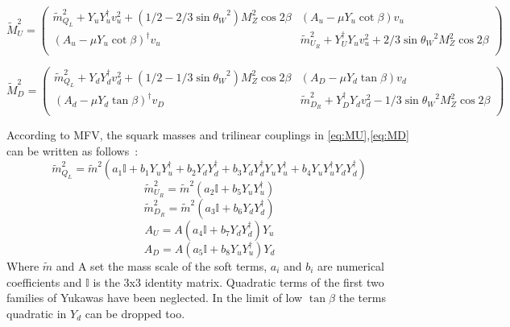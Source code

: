\begin{equation}
\tilde{M}_U^2 = 
\left( \begin{matrix}
\tilde{m}_{Q_L}^2 + Y_uY_u^{\dagger}v_u^2 + (1/2 - 2/3\sin{\theta_W}^2)M_Z^2\cos{2\beta} & (A_u - \mu Y_u\cot{\beta})v_u \\
(A_u - \mu Y_u\cot{\beta})^{\dagger}v_u & \tilde{m}_{U_R}^2 + Y_U^{\dagger}Y_uv_u^2 + 2/3\sin{\theta_W}^2M_Z^2\cos{2\beta} \\
\end{matrix}\right)
\label{eq:MU}
\end{equation}

\begin{equation}
\tilde{M}_D^2 = 
\left( \begin{matrix}
\tilde{m}_{Q_L}^2 + Y_dY_d^{\dagger}v_d^2 + (1/2 - 1/3\sin{\theta_W}^2)M_Z^2\cos{2\beta} & (A_D - \mu Y_d\tan{\beta})v_d \\
(A_d - \mu Y_d\tan{\beta})^{\dagger}v_D & \tilde{m}_{D_R}^2 + Y_D^{\dagger}Y_dv_d^2 - 1/3\sin{\theta_W}^2M_Z^2\cos{2\beta} \\
\end{matrix}\right)
\label{eq:MD}
\end{equation}

According to MFV, the squark masses and trilinear couplings in \ref{eq:MU},\ref{eq:MD} can be written as follows~\cite{DAmbrosio:2002vsn}:
\begin{equation}
\tilde{m}_{Q_L}^2 = \tilde{m}^2(a_1\mathbb{I} + b_1Y_uY_u^{\dagger} + b_2Y_dY_d^{\dagger} + b_3Y_dY_d^{\dagger}Y_uY_u^{\dagger} + b_4Y_uY_u^{\dagger}Y_dY_d^{\dagger})
\label{eq:soft1}
\end{equation}
\begin{equation}
\tilde{m}_{U_R}^2 = \tilde{m}^2(a_2\mathbb{I} + b_5Y_uY_u^{\dagger})
\label{eq:soft2}
\end{equation}
\begin{equation}
\tilde{m}_{D_R}^2 = \tilde{m}^2(a_3\mathbb{I} + b_6Y_dY_d^{\dagger})
\label{eq:soft3}
\end{equation}
\begin{equation}
A_U = A(a_4\mathbb{I} + b_7Y_dY_d^{\dagger})Y_u
\label{eq:soft4}
\end{equation}
\begin{equation}
A_D = A(a_5\mathbb{I} + b_8Y_uY_u^{\dagger})Y_d
\label{eq:soft5}
\end{equation}
Where $\tilde{m}$ and A set the mass scale of the soft terms, $a_i$ and $b_i$ are numerical coefficients and $\mathbb{I}$ is the 3x3 identity matrix. Quadratic terms of the first two families of Yukawas have been neglected. In the limit of low $\tan{\beta}$ the terms quadratic in $Y_d$ can be dropped too.%

